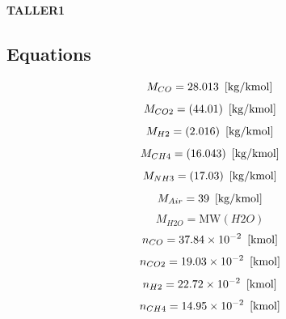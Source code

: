 \documentclass[10pt,fleqn]{article}
\newcommand{\F}[1]{\mbox{$#1$}}
\newcommand{\molarmass}{\mathrm{MW}}
\begin{document}
\begin{center}
\bf \mbox{TALLER1}
\vspace{0.2 in}
\end{center}
\subsection*{Equations}
\begin{equation}
\label{EES Eqn:1}
M_{CO} = 28.013   \   \left[ \rm kg/kmol \right] 
\end{equation}
{\color{blue} \rm}
\begin{equation}
\label{EES Eqn:2}
M_{CO2} =  \left( 44.01 \right)    \   \left[ \rm kg/kmol \right] 
\end{equation}
{\color{blue} \rm}
\begin{equation}
\label{EES Eqn:3}
M_{H2} =  \left( 2.016 \right)    \   \left[ \rm kg/kmol \right] 
\end{equation}
{\color{blue} \rm}
\begin{equation}
\label{EES Eqn:4}
M_{CH4} =  \left( 16.043 \right)    \   \left[ \rm kg/kmol \right] 
\end{equation}
{\color{blue} \rm}
\begin{equation}
\label{EES Eqn:5}
M_{NH3} =  \left( 17.03 \right)    \   \left[ \rm kg/kmol \right] 
\end{equation}
{\color{blue} \rm}
\begin{equation}
\label{EES Eqn:6}
M_{Air} = 39   \   \left[ \rm kg/kmol \right] 
\end{equation}
{\color{blue} \rm}
\begin{equation}
\label{EES Eqn:7}
M_{H2O} = \molarmass \left(\F{H2O }\right)  
\end{equation}
\begin{equation}
\label{EES Eqn:8}
n_{CO} = 37.84\times 10^{-2}   \   \left[ \rm kmol \right] 
\end{equation}
{\color{blue} \rm}
\begin{equation}
\label{EES Eqn:9}
n_{CO2} = 19.03\times 10^{-2}   \   \left[ \rm kmol \right] 
\end{equation}
{\color{blue} \rm}
\begin{equation}
\label{EES Eqn:10}
n_{H2} = 22.72\times 10^{-2}   \   \left[ \rm kmol \right] 
\end{equation}
{\color{blue} \rm}
\begin{equation}
\label{EES Eqn:11}
n_{CH4} = 14.95\times 10^{-2}   \   \left[ \rm kmol \right] 
\end{equation}
\end{document}

